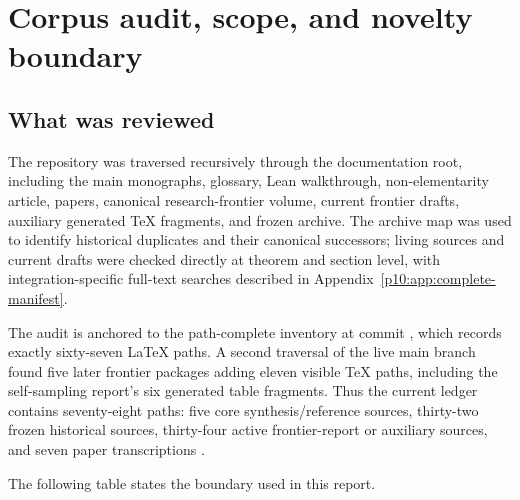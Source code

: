 \documentclass[11pt,oneside]{article}
\theoremstyle{definition}
\theoremstyle{remark}
\newcommand{\1}{\mathbf 1}
\begin{document}
\bigskip

\section{Corpus audit, scope, and novelty boundary}

\subsection{What was reviewed}

The repository was traversed recursively through the documentation root, including the
main monographs, glossary, Lean walkthrough, non-elementarity article, papers, canonical
research-frontier volume, current frontier drafts, auxiliary generated TeX fragments, and
frozen archive.  The archive map was used to identify historical duplicates and their
canonical successors; living sources and current drafts were checked directly at theorem
and section level, with integration-specific full-text searches described in
Appendix~\ref{p10:app:complete-manifest}.

The audit is anchored to the path-complete inventory at commit
, which records exactly sixty-seven
LaTeX paths.  A second traversal of the live main branch found five later frontier packages
adding eleven visible TeX paths, including the self-sampling report's six generated table
fragments.  Thus the current ledger contains seventy-eight paths: five core
synthesis/reference sources, thirty-two frozen historical sources, thirty-four active
frontier-report or auxiliary sources, and seven paper transcriptions
\cite{p10:ProveIt,p10:ProveItFrontiers,p10:ProveItInventory}.

The following table states the boundary used in this report.
\end{document}
